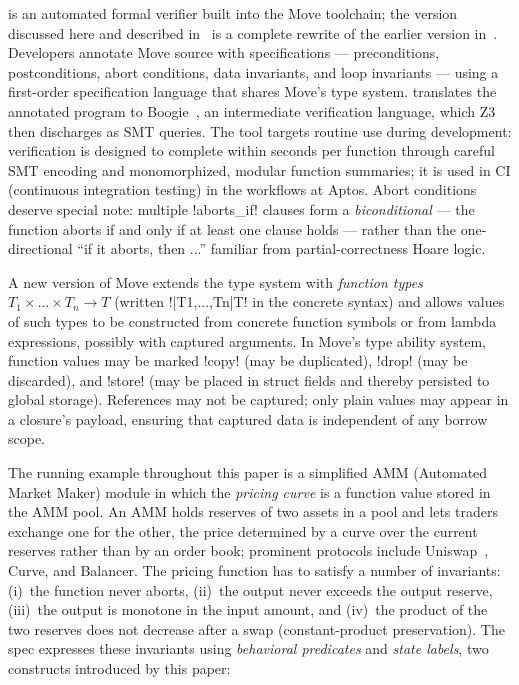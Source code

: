 \MVP is an automated formal verifier built into the Move toolchain;
the version discussed here and described in~\cite{DillGPQXZ22} is a complete rewrite of the earlier version in~\cite{MOVE_PROVER}.
Developers annotate Move source with specifications --- preconditions, postconditions, abort conditions, data invariants, and loop invariants --- using a first-order specification language that shares Move's type system.
\MVP translates the annotated program to Boogie~\cite{boogie,thisisboogie2}, an intermediate verification language, which Z3~\cite{z3} then discharges as SMT queries.
The tool targets routine use during development: verification is designed to complete within seconds per function through careful SMT encoding and monomorphized, modular function summaries; it is used in CI (continuous integration testing) in the workflows at Aptos.
Abort conditions deserve special note: multiple !aborts_if! clauses form a \emph{biconditional} --- the function aborts if and only if at least one clause holds --- rather than the one-directional ``if it aborts, then ...'' familiar from partial-correctness Hoare logic.

A new version of Move extends the type system with \emph{function types} $T_1 \times \dots \times T_n \to T$ (written !|T1,...,Tn|T! in the concrete syntax) and allows values of such types to be constructed from concrete function symbols or from lambda expressions, possibly with captured arguments.
In Move's type ability system, function values may be marked !copy! (may be duplicated), !drop! (may be discarded), and !store! (may be placed in struct fields and thereby persisted to global storage).
References may not be captured; only plain values may appear in a closure's payload, ensuring that captured data is independent of any borrow scope.

\label{sec:amm}

The running example throughout this paper is a simplified AMM (Automated Market Maker) module in which the \emph{pricing curve} is a function value stored in the AMM pool.
An AMM holds reserves of two assets in a pool and lets traders exchange one for the other, the price determined by a curve over the current reserves rather than by an order book; prominent protocols include Uniswap~\cite{UniswapV2}, Curve, and Balancer.
The pricing function has to satisfy a number of invariants: (i)~the function never aborts, (ii)~the output never exceeds the output reserve, (iii)~the output is monotone in the input amount, and (iv)~the product of the two reserves does not decrease after a swap (constant-product preservation).
The spec expresses these invariants using \emph{behavioral predicates} and \emph{state labels}, two constructs introduced by this paper:


